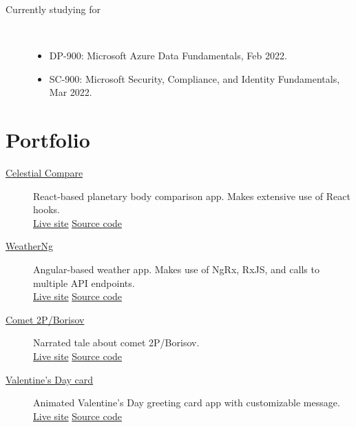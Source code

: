 \documentclass{article}
\begin{document}
\begin{description}
  \item [Currently studying for] ~
  \begin{itemize}
    \item DP-900: Microsoft Azure Data Fundamentals, Feb 2022.
    \item SC-900: Microsoft Security, Compliance, and Identity Fundamentals, Mar 2022.
  \end{itemize} 
\end{description}

\vspace{-0.5em}
\section*{Portfolio}\vspace{-0.5em}

\begin{description}
  \item[\href{https://sirkoik.github.io/Celestial-Compare}{Celestial Compare}] React-based planetary body comparison app. Makes extensive use of React hooks.\\ \href{https://sirkoik.github.io/Celestial-Compare}{Live site} \textcolor{gray}{\textbullet} \href{https://github.com/sirkoik/Celestial-Compare}{Source code}
  \item[\href{https://sirkoik.github.io/WeatherNg}{WeatherNg}] Angular-based weather app. Makes use of NgRx, RxJS, and calls to multiple API endpoints.\\ \href{https://sirkoik.github.io/WeatherNg}{Live site} \textcolor{gray}{\textbullet} \href{https://github.com/sirkoik/WeatherNg}{Source code}
  \item[\href{https://sirkoik.github.io/BorisovXmas}{Comet 2P/Borisov}] Narrated tale about comet 2P/Borisov.\\ \href{https://sirkoik.github.io/BorisovXmas}{Live site} \textcolor{gray}{\textbullet} \href{https://github.com/sirkoik/BorisovXmas}{Source code}
  \item[\href{https://sirkoik.github.io/February}{Valentine's Day card}] Animated Valentine's Day greeting card app with customizable message.\\
   \href{https://sirkoik.github.io/February}{Live site} \textcolor{gray}{\textbullet} \href{https://github.com/sirkoik/February}{Source code}
\end{description}
\end{document}
